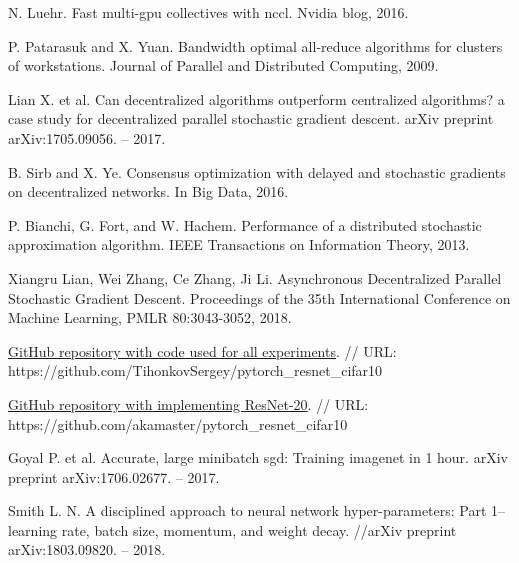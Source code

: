 \documentclass[a4paper,article,14pt]{extarticle}
\begin{document}
\begin{thebibliography}{1}
  N. Luehr. \flqq Fast multi-gpu collectives with nccl\frqq. Nvidia blog, 2016.

  P. Patarasuk and X. Yuan. \flqq Bandwidth optimal all-reduce algorithms for clusters of workstations\frqq. Journal of Parallel and Distributed Computing, 2009.

 Lian X. et al. \flqq Can decentralized algorithms outperform centralized algorithms? a case study for decentralized parallel stochastic gradient descent\frqq. arXiv preprint arXiv:1705.09056. – 2017.

 B. Sirb and X. Ye. \flqq Consensus optimization with delayed and stochastic gradients on decentralized networks\frqq. In Big Data, 2016.

 P. Bianchi, G. Fort, and W. Hachem. \flqq Performance of a distributed stochastic approximation algorithm\frqq. IEEE Transactions on Information Theory, 2013.

 Xiangru Lian, Wei Zhang, Ce Zhang, Ji Li. \flqq Asynchronous Decentralized Parallel Stochastic Gradient Descent\frqq. Proceedings of the 35th International Conference on Machine Learning, PMLR 80:3043-3052, 2018.

 \href{https://github.com/TihonkovSergey/pytorch_resnet_cifar10}{GitHub repository with code used for all experiments}. // URL: https://github.com/TihonkovSergey/pytorch\_resnet\_cifar10

 \href{https://github.com/akamaster/pytorch_resnet_cifar10}{GitHub repository with implementing ResNet-20}. // URL: https://github.com/akamaster/pytorch\_resnet\_cifar10

 Goyal P. et al. \flqq Accurate, large minibatch sgd: Training imagenet in 1 hour\frqq. arXiv preprint arXiv:1706.02677. – 2017.

 Smith L. N. \flqq A disciplined approach to neural network hyper-parameters: Part 1--learning rate, batch size, momentum, and weight decay\frqq. //arXiv preprint arXiv:1803.09820. – 2018.

\end{thebibliography}
\end{document}
